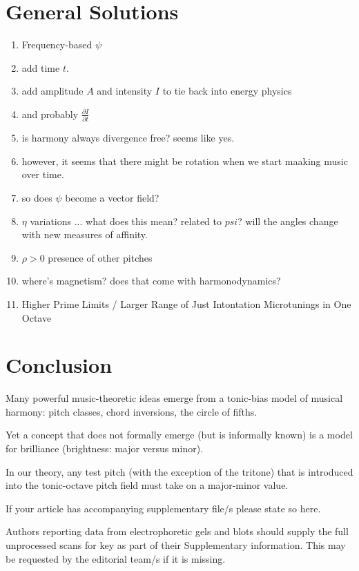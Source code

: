 \documentclass[sn-mathphys]{sn-jnl}%
\begin{document}
\section{General Solutions}\label{sec12}


\begin{enumerate}
  
\item Frequency-based $\psi$
\item add time $t$.
\item add amplitude $A$ and intensity $I$ to tie back into energy physics
\item and probably $\frac{\partial I}{\partial t}$
\item is harmony always divergence free? seems like yes.
\item however, it seems that there might be rotation when we start maaking music over time.
\item so does $\psi$ become a vector field?
\item $\eta$ variations ... what does this mean? related to $psi$? will the angles change with new measures of affinity.
\item $\rho>0$ presence of other pitches
\item where's magnetism? does that come with harmonodynamics?
\item Higher Prime Limits / Larger Range of Just Intontation Microtunings in One Octave
\end{enumerate}


\section{Conclusion}\label{sec13}

Many powerful music-theoretic ideas emerge from a tonic-bias model of musical harmony: pitch classes, chord inversions, the circle of fifths.

Yet a concept that does not formally emerge (but is informally known) is a model for brilliance (brightness: major versus minor).

In our theory, any test pitch (with the exception of the tritone) that is introduced into the tonic-octave pitch field must take on a major-minor value. 

\backmatter


If your article has accompanying supplementary file/s please state so here. 

Authors reporting data from electrophoretic gels and blots should supply the full unprocessed scans for key as part of their Supplementary information. This may be requested by the editorial team/s if it is missing.
\end{document}
